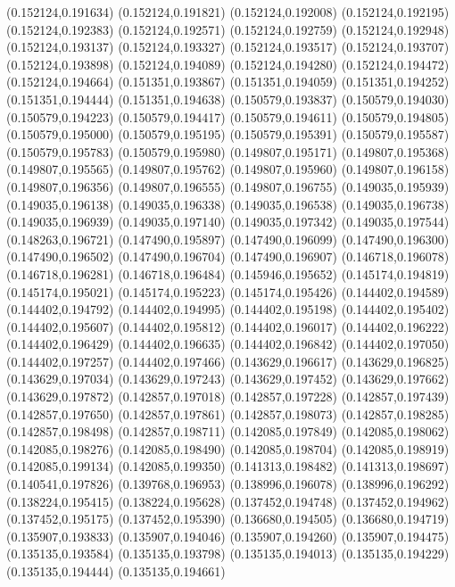 (0.152124,0.191634)
(0.152124,0.191821)
(0.152124,0.192008)
(0.152124,0.192195)
(0.152124,0.192383)
(0.152124,0.192571)
(0.152124,0.192759)
(0.152124,0.192948)
(0.152124,0.193137)
(0.152124,0.193327)
(0.152124,0.193517)
(0.152124,0.193707)
(0.152124,0.193898)
(0.152124,0.194089)
(0.152124,0.194280)
(0.152124,0.194472)
(0.152124,0.194664)
(0.151351,0.193867)
(0.151351,0.194059)
(0.151351,0.194252)
(0.151351,0.194444)
(0.151351,0.194638)
(0.150579,0.193837)
(0.150579,0.194030)
(0.150579,0.194223)
(0.150579,0.194417)
(0.150579,0.194611)
(0.150579,0.194805)
(0.150579,0.195000)
(0.150579,0.195195)
(0.150579,0.195391)
(0.150579,0.195587)
(0.150579,0.195783)
(0.150579,0.195980)
(0.149807,0.195171)
(0.149807,0.195368)
(0.149807,0.195565)
(0.149807,0.195762)
(0.149807,0.195960)
(0.149807,0.196158)
(0.149807,0.196356)
(0.149807,0.196555)
(0.149807,0.196755)
(0.149035,0.195939)
(0.149035,0.196138)
(0.149035,0.196338)
(0.149035,0.196538)
(0.149035,0.196738)
(0.149035,0.196939)
(0.149035,0.197140)
(0.149035,0.197342)
(0.149035,0.197544)
(0.148263,0.196721)
(0.147490,0.195897)
(0.147490,0.196099)
(0.147490,0.196300)
(0.147490,0.196502)
(0.147490,0.196704)
(0.147490,0.196907)
(0.146718,0.196078)
(0.146718,0.196281)
(0.146718,0.196484)
(0.145946,0.195652)
(0.145174,0.194819)
(0.145174,0.195021)
(0.145174,0.195223)
(0.145174,0.195426)
(0.144402,0.194589)
(0.144402,0.194792)
(0.144402,0.194995)
(0.144402,0.195198)
(0.144402,0.195402)
(0.144402,0.195607)
(0.144402,0.195812)
(0.144402,0.196017)
(0.144402,0.196222)
(0.144402,0.196429)
(0.144402,0.196635)
(0.144402,0.196842)
(0.144402,0.197050)
(0.144402,0.197257)
(0.144402,0.197466)
(0.143629,0.196617)
(0.143629,0.196825)
(0.143629,0.197034)
(0.143629,0.197243)
(0.143629,0.197452)
(0.143629,0.197662)
(0.143629,0.197872)
(0.142857,0.197018)
(0.142857,0.197228)
(0.142857,0.197439)
(0.142857,0.197650)
(0.142857,0.197861)
(0.142857,0.198073)
(0.142857,0.198285)
(0.142857,0.198498)
(0.142857,0.198711)
(0.142085,0.197849)
(0.142085,0.198062)
(0.142085,0.198276)
(0.142085,0.198490)
(0.142085,0.198704)
(0.142085,0.198919)
(0.142085,0.199134)
(0.142085,0.199350)
(0.141313,0.198482)
(0.141313,0.198697)
(0.140541,0.197826)
(0.139768,0.196953)
(0.138996,0.196078)
(0.138996,0.196292)
(0.138224,0.195415)
(0.138224,0.195628)
(0.137452,0.194748)
(0.137452,0.194962)
(0.137452,0.195175)
(0.137452,0.195390)
(0.136680,0.194505)
(0.136680,0.194719)
(0.135907,0.193833)
(0.135907,0.194046)
(0.135907,0.194260)
(0.135907,0.194475)
(0.135135,0.193584)
(0.135135,0.193798)
(0.135135,0.194013)
(0.135135,0.194229)
(0.135135,0.194444)
(0.135135,0.194661)
